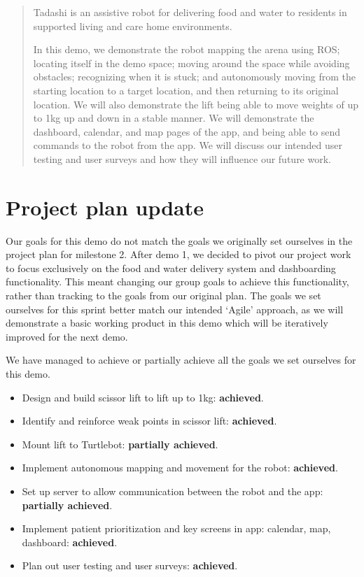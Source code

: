 \documentclass{article}
\begin{document}
 


\begin{abstract}
  Tadashi is an assistive robot for delivering food and water to residents in supported living and care home environments.

  In this demo, we demonstrate the robot mapping the arena using ROS; locating itself in the demo space; moving around the space while avoiding obstacles; recognizing when it is stuck; and autonomously moving from the starting location to a target location, and then returning to its original location. We will also demonstrate the lift being able to move weights of up to 1kg up and down in a stable manner. We will demonstrate the dashboard, calendar, and map pages of the app, and being able to send commands to the robot from the app. We will discuss our intended user testing and user surveys and how they will influence our future work.
\end{abstract} 

\section{Project plan update}
Our goals for this demo do not match the goals we originally set ourselves in the project plan for milestone 2. After demo 1, we decided to pivot our project work to focus exclusively on the food and water delivery system and dashboarding functionality. This meant changing our group goals to achieve this functionality, rather than tracking to the goals from our original plan. The goals we set ourselves for this sprint better match our intended `Agile' approach, as we will demonstrate a basic working product in this demo which will be iteratively improved for the next demo.

We have managed to achieve or partially achieve all the goals we set ourselves for this demo.
\begin{itemize}
\item Design and build scissor lift to lift up to 1kg: {\bf achieved}.
\item Identify and reinforce weak points in scissor lift: {\bf achieved}.
\item Mount lift to Turtlebot: {\bf partially achieved}.
\item Implement autonomous mapping and movement for the robot: {\bf achieved}.
\item Set up server to allow communication between the robot and the app: {\bf partially achieved}. 
\item Implement patient prioritization and key screens in app: calendar, map, dashboard: {\bf achieved}.
\item Plan out user testing and user surveys: {\bf achieved}.
\end{itemize}
\end{document}
